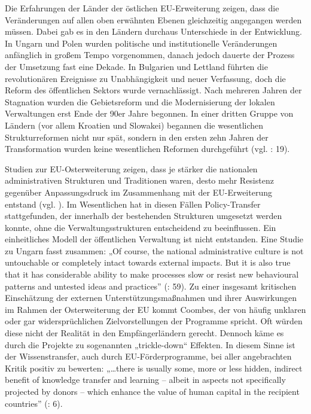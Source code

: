 Die Erfahrungen der Länder der östlichen EU-Erweiterung zeigen, dass die Veränderungen auf allen oben erwähnten Ebenen gleichzeitig angegangen werden müssen. Dabei gab es in den Ländern durchaus Unterschiede in der Entwicklung. In Ungarn und Polen wurden politische und institutionelle Veränderungen anfänglich in großem Tempo vorgenommen, danach jedoch dauerte der Prozess der Umsetzung fast eine Dekade. In Bulgarien und Lettland führten die revolutionären Ereignisse zu Unabhängigkeit und neuer Verfassung, doch die Reform des öffentlichen Sektors wurde vernachlässigt. Nach mehreren Jahren der Stagnation wurden die Gebietsreform und die Modernisierung der lokalen Verwaltungen erst Ende der 90er Jahre begonnen. In einer dritten Gruppe von Ländern (vor allem Kroatien und Slowakei) begannen die wesentlichen Strukturreformen nicht nur spät, sondern in den ersten zehn Jahren der Transformation wurden keine wesentlichen Reformen durchgeführt (vgl. \cite{petzen}: 19).  \par

Studien zur EU-Osterweiterung zeigen, dass je stärker die nationalen administrativen Strukturen und Traditionen waren, desto mehr Resistenz gegenüber Anpassungsdruck im Zusammenhang mit der EU-Erweiterung entstand (vgl. \cite{knill01, goetz01b}). Im Wesentlichen hat in diesen Fällen Policy-Transfer stattgefunden, der innerhalb der bestehenden Strukturen umgesetzt werden konnte, ohne die Verwaltungsstrukturen entscheidend zu beeinflussen. Ein einheitliches Modell der öffentlichen Verwaltung ist nicht entstanden. Eine Studie zu Ungarn fasst zusammen: „Of course, the national administrative culture is not untouchable or completely intact towards external impacts. But it is also true that it has considerable ability to make processes slow or resist new behavioural patterns and untested ideas and practices” (\cite{szente}: 59). Zu einer insgesamt kritischen Einschätzung der externen Unterstützungsmaßnahmen und ihrer Auswirkungen im Rahmen der Osterweiterung der EU kommt Coombes, der von häufig unklaren oder gar widersprüchlichen Zielvorstellungen der Programme spricht. Oft würden diese nicht der Realität in den Empfängerländern gerecht. Dennoch käme es durch die Projekte zu sogenannten „trickle-down“ Effekten. In diesem Sinne ist der Wissenstransfer, auch durch EU-Förderprogramme, bei aller angebrachten Kritik positiv zu bewerten: „…there is usually some, more or less hidden, indirect benefit of knowledge transfer and learning – albeit in aspects not specifically projected by donors – which enhance the value of human capital in the recipient countries” (\cite{coombes}: 6). \par

